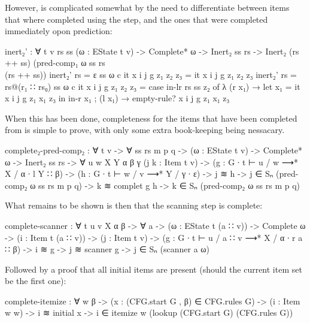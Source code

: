 		However,  is complicated somewhat by the need to 
		differentiate between items that where completed using the 
		 step, and the ones that were completed immediately opon 
		prediction:

		\begin{code}
			inert₂' : ∀ {t v rs ss} (ω : EState t v) ->
			  Complete* ω ->
			  Inert₂ ss rs ->
			  Inert₂ (rs ++ ss) (pred-comp₁ ω ss rs \\ (rs ++ ss))
			inert₂' {rs = ε} {ss} ω c it x i j g z₁ z₂ z₃ = it x i j g z₁ z₂ z₃
			inert₂' {rs = rs@(r₁ ∷ rs₀)} {ss} ω c it x i j g z₁ z₂ z₃ =
			  case in-lr rs ss z₂ of
			    λ { (r x₁) →
			      let x₁ = it x i j g z₁ x₁ z₃  in
			      in-r x₁
			    ; (l x₁) → empty-rule? x i j g z₁ x₁ z₃
			    }
		\end{code}

		When this has been done, completeness for the items that have been
		completed from  is simple to prove, with only some
		extra book-keeping being nessacary.

		\begin{code}
			complete₂-pred-comp₂ : ∀ {t v} -> ∀ ss rs m p q ->
			  (ω : EState t v) ->
			  Complete* ω ->
			  Inert₂ ss rs ->
			  ∀ {u w X Y α β γ}
			  (j k : Item t v) ->
			  (g : G ∙ t ⊢ u / w ⟶* X / α ∙ l Y ∷ β) ->
			  (h : G ∙ t ⊢ w / v ⟶* Y / γ ∙ ε) ->
			  j ≋ h -> j ∈ Sₙ (pred-comp₂ ω ss rs m p q) ->
			  k ≋ complet g h ->
			    k ∈ Sₙ (pred-comp₂ ω ss rs m p q)
		\end{code}

		What remains to be shown is then that the scanning step is complete:

		\begin{code}
			complete-scanner : ∀ {t u v X α β} -> ∀ a ->
			  (ω : EState t (a ∷ v)) ->
			  Complete ω ->
			  (i : Item t (a ∷ v)) ->
			  (j : Item t v) ->
			  (g : G ∙ t ⊢ u / a ∷ v ⟶* X / α ∙ r a ∷ β) ->
			  i ≋ g ->
			  j ≋ scanner g ->
			    j ∈ Sₙ (scanner a ω)
		\end{code}
		
		Followed by a proof that all initial items are present (should the
		current item set be the first one):
		
		\begin{code}
			complete-itemize : ∀ w {β} ->
			  (x : (CFG.start G , β) ∈ CFG.rules G) ->
			  (i : Item w w) ->
			  i ≋ initial x ->
			    i ∈ itemize w (lookup (CFG.start G) (CFG.rules G))
		\end{code}

